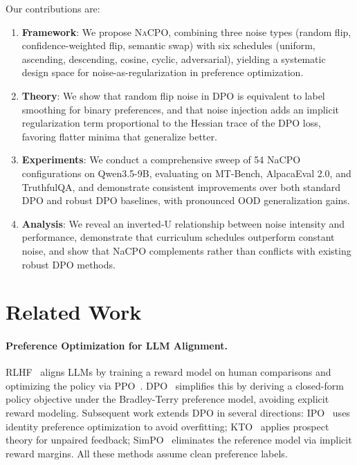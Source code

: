 \documentclass{article}
\newcommand{\nacpo}{\textsc{NaCPO}}
\newcommand{\dpo}{\textsc{DPO}}
\begin{document}
Our contributions are:
\begin{enumerate}[leftmargin=*, itemsep=1pt, topsep=2pt]
    \item \textbf{Framework}: We propose \nacpo{}, combining three noise types (random flip, confidence-weighted flip, semantic swap) with six schedules (uniform, ascending, descending, cosine, cyclic, adversarial), yielding a systematic design space for noise-as-regularization in preference optimization.
    \item \textbf{Theory}: We show that random flip noise in DPO is equivalent to label smoothing for binary preferences, and that noise injection adds an implicit regularization term proportional to the Hessian trace of the DPO loss, favoring flatter minima that generalize better.
    \item \textbf{Experiments}: We conduct a comprehensive sweep of 54 NaCPO configurations on Qwen3.5-9B, evaluating on MT-Bench, AlpacaEval 2.0, and TruthfulQA, and demonstrate consistent improvements over both standard DPO and robust DPO baselines, with pronounced OOD generalization gains.
    \item \textbf{Analysis}: We reveal an inverted-U relationship between noise intensity and performance, demonstrate that curriculum schedules outperform constant noise, and show that NaCPO complements rather than conflicts with existing robust DPO methods.
\end{enumerate}


\section{Related Work}
\label{sec:related}

\paragraph{Preference Optimization for LLM Alignment.}
RLHF~\cite{PLACEHOLDER_ouyang2022training} aligns LLMs by training a reward model on human comparisons and optimizing the policy via PPO~\cite{PLACEHOLDER_schulman2017proximal}.
\dpo{}~\cite{PLACEHOLDER_rafailov2023direct} simplifies this by deriving a closed-form policy objective under the Bradley-Terry preference model, avoiding explicit reward modeling.
Subsequent work extends DPO in several directions:
IPO~\cite{PLACEHOLDER_azar2024general} uses identity preference optimization to avoid overfitting;
KTO~\cite{PLACEHOLDER_ethayarajh2024kto} applies prospect theory for unpaired feedback;
SimPO~\cite{PLACEHOLDER_meng2024simpo} eliminates the reference model via implicit reward margins.
All these methods assume clean preference labels.
\end{document}

